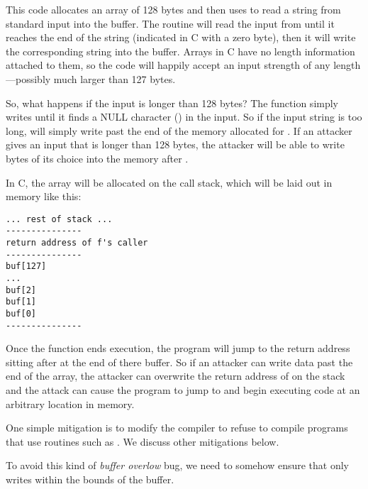 This code allocates an array of 128 bytes and then uses  to
read a string from standard input into the buffer.
The  routine will read the input from until it reaches the
end of the string (indicated in C with a zero byte), then it will
write the corresponding string into the buffer.
Arrays in C have no length information attached to them, so the 
code will happily accept an input strength of any length---possibly much larger
than 127 bytes.

So, what happens if the input is 
longer than 128 bytes? The  function simply writes until
it finds a NULL character () in the input. 
So if the input string is too long,  will simply write past
the end of the memory allocated for . 
If an attacker gives an input that is longer than 128 bytes,
the attacker will be able to write bytes of its choice into the 
memory after .

In C, the  array will be allocated on the call stack, which will be
laid out in memory like this:
\begin{verbatim}
... rest of stack ...
---------------
return address of f's caller
---------------
buf[127]
...
buf[2]
buf[1]
buf[0]
---------------
\end{verbatim}

Once the  function ends execution, the program will jump to the
return address sitting after at the end of there buffer.
So if an attacker can write data past the end of the  array, 
the attacker can overwrite the return address of  on the stack
and the attack can cause the program to jump to and begin executing
code at an arbitrary location in memory.

One simple mitigation is to 
modify the compiler to refuse to compile programs that use 
routines such as .
We discuss other mitigations below.


To avoid this kind of \emph{buffer overlow} bug, we need to somehow ensure that
 only writes within the bounds of the buffer. 


